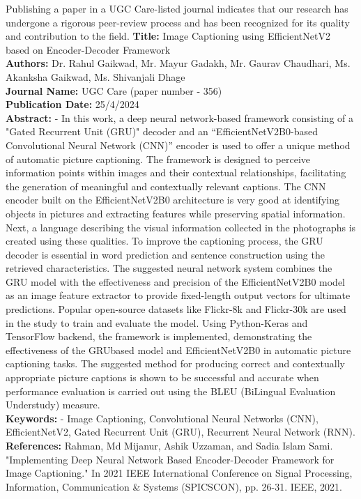 \documentclass[oneside,a4paper,12pt]{report}
\begin{document}
\begin{appendices}
Publishing a paper in a UGC Care-listed journal indicates that our research has undergone a rigorous peer-review process and has been recognized for its quality and contribution to the field. 
\textbf{Title:} Image Captioning using EfficientNetV2 based on Encoder-Decoder Framework\\ 
\textbf{Authors:} Dr. Rahul Gaikwad, Mr. Mayur Gadakh, Mr. Gaurav Chaudhari, Ms. Akanksha Gaikwad, Ms. Shivanjali Dhage\\
\textbf{Journal Name:} UGC Care (paper number - 356)\\
\textbf{Publication Date:} 25/4/2024\\
\textbf{Abstract:} - In this work, a deep neural network-based framework consisting of a "Gated Recurrent Unit (GRU)" decoder and an “EfficientNetV2B0-based Convolutional Neural Network (CNN)” encoder is used to offer a unique method of automatic picture captioning. The framework is designed to perceive information points within images and their contextual relationships, facilitating the generation of meaningful and contextually relevant captions. The CNN encoder built on the EfficientNetV2B0 architecture is very good at identifying objects in pictures and extracting features while preserving spatial information. Next, a language describing the visual information collected in the photographs is created using these qualities. To improve the captioning process, the GRU decoder is essential in word prediction and sentence construction using the retrieved characteristics. The suggested neural network system combines the GRU model with the effectiveness and precision of the EfficientNetV2B0 model as an image feature extractor to provide fixed-length output vectors for ultimate predictions. Popular open-source datasets like Flickr-8k and Flickr-30k are used in the study to train and evaluate the model. Using Python-Keras and TensorFlow backend, the framework is implemented, demonstrating the effectiveness of the GRUbased model and EfficientNetV2B0 in automatic picture captioning tasks. The suggested method for producing correct and contextually appropriate picture captions is shown to be successful and accurate when performance evaluation is carried out using the BLEU (BiLingual Evaluation Understudy) measure.\\
\textbf{Keywords:} - Image Captioning, Convolutional Neural Networks (CNN), EfficientNetV2, Gated Recurrent Unit (GRU), Recurrent Neural Network (RNN).\\
\textbf{References:} Rahman, Md Mijanur, Ashik Uzzaman, and Sadia Islam Sami. "Implementing Deep Neural Network Based Encoder-Decoder Framework for Image Captioning." In 2021 IEEE International Conference on Signal Processing, Information, Communication \& Systems (SPICSCON), pp. 26-31. IEEE, 2021.\\



\end{appendices}
\end{document}
